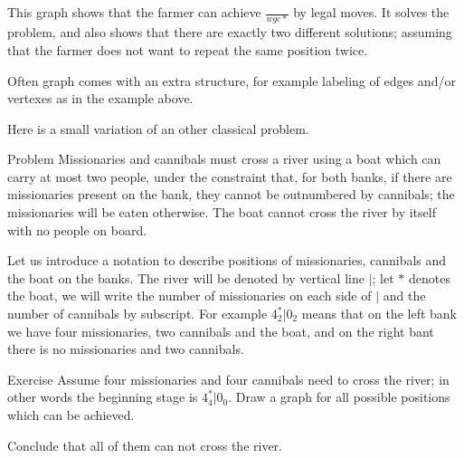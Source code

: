 \begin{center}
\end{center}

This graph shows that the farmer can achieve $\tfrac{}{wgc{*}}$ by legal moves.
It solves the problem, and also shows that there are exactly two different solutions;
assuming that the farmer does not want to repeat the same position twice. 
\qeds

Often graph comes with an extra structure, for example labeling of edges and/or vertexes as in the example above.

Here is a small variation of an other classical problem.

\begin{thm}{Problem} Missionaries and cannibals must cross a river using a boat which can carry at most two people, under the constraint that, for both banks, if there are missionaries present on the bank, they cannot be outnumbered by cannibals; the missionaries will be eaten otherwise.
The boat cannot cross the river by itself with no people on board.
\end{thm}

Let us introduce a notation to describe positions of missionaries, cannibals and the boat on the banks.
The river will be denoted by vertical line $|$;
let $*$ denotes the boat, we will write the number of missionaries on each side of $|$ and the number of cannibals by subscript. For example $4_2^*|0_2$ means that on the left bank we have four missionaries, two cannibals and the boat, and on the right bant there is no missionaries and two cannibals.

\begin{thm}{Exercise}
Assume four missionaries and four cannibals need to cross the river; in other words the beginning stage is $4_4^*|0_0$.
Draw a graph for all possible positions which can be achieved.

Conclude that all of them can not cross the river.
\end{thm}
